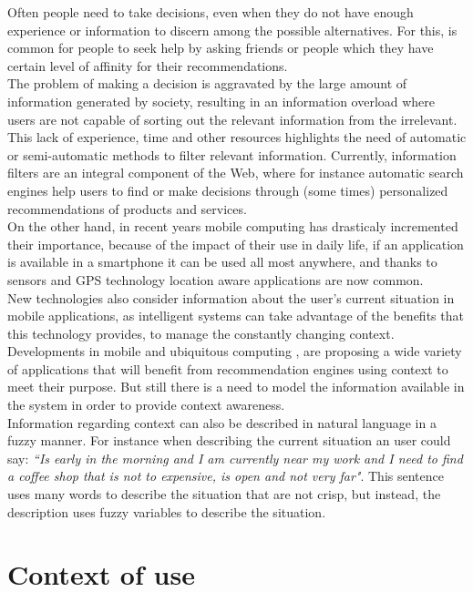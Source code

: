 Often people need to take decisions, even when they do not
have enough experience or information to discern among 
the possible alternatives. For this, is common for people to 
seek help by asking friends  or people which they  
have certain level of affinity for their recommendations.\\
The problem of making a decision is aggravated by the 
large amount of information generated by society, 
resulting in an information overload where users are not capable of
sorting out the relevant information from the irrelevant.
This lack of experience, time and other resources 
highlights the need of automatic or semi-automatic methods 
to filter relevant information. Currently, information filters are
an integral component of the Web, where for instance
automatic search engines help users to find or make 
decisions through (some times) personalized recommendations
of products and services. \\ On the other hand, in recent
years  mobile computing has drasticaly incremented their importance, 
because of the impact of their use in daily life, if an application 
is available in a smartphone it can be used all most anywhere, and thanks
to sensors and GPS technology location aware applications are now common.\\ 
New technologies also consider information about the user's current situation 
in mobile applications, as intelligent systems can take advantage of the
benefits that this technology provides, to manage the constantly changing 
context. \\ Developments in mobile and ubiquitous computing \cite{noguera2012mobile}
\cite{chiou2010adaptive}, are proposing a wide variety of applications
that will benefit from recommendation engines using context to meet their
purpose. But still there is a need to model the information available in
the system in order to provide context awareness.\\  Information regarding 
context can also be described in natural language in a fuzzy manner. For
instance when describing the current situation an user could say: \textit{``Is early in
the morning and I am currently near my work and I need to find a coffee
shop that is not to expensive, is open and not very far"}.
This sentence uses many words to describe the situation that are not 
crisp, but instead, the description uses fuzzy variables to describe the situation.  

\section{Context of use}\label{contextofuse}


